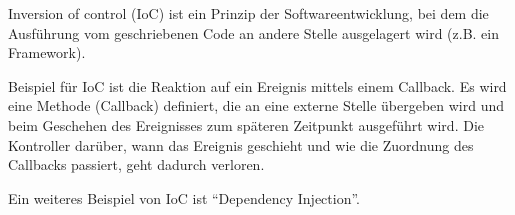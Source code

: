 Inversion of control (IoC) ist ein Prinzip der Softwareentwicklung, 
bei dem die Ausführung vom geschriebenen Code an andere Stelle ausgelagert wird
(z.B. ein Framework).

Beispiel für IoC ist die Reaktion auf ein Ereignis mittels einem Callback. 
Es wird eine Methode (Callback) definiert, die an eine externe Stelle übergeben wird und 
beim Geschehen des Ereignisses zum späteren Zeitpunkt ausgeführt wird. 
Die Kontroller darüber, wann das Ereignis geschieht und wie die Zuordnung des Callbacks passiert, geht dadurch verloren. 

Ein weiteres Beispiel von IoC ist ``Dependency Injection''.